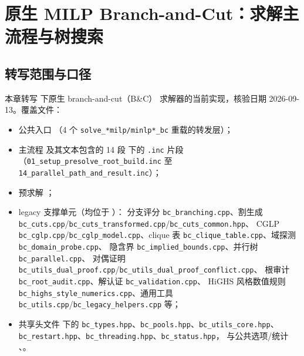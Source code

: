 
\section{原生 MILP Branch-and-Cut：求解主流程与树搜索}\label{sec:impl-milpbc}

\subsection{转写范围与口径}\label{subsec:milpbc-scope}

本章转写  下原生 branch-and-cut（B\&C）
求解器的当前实现，核验日期 2026-09-13。覆盖文件：

\begin{itemize}
  \item 公共入口 （4 个
        \texttt{solve\_*milp/minlp*\_bc} 重载的转发层）；
  \item 主流程 
        及其文本包含的 14 段 
        下的 \texttt{.inc} 片段（\texttt{01\_setup\_presolve\_root\_build.inc} 至
        \texttt{14\_parallel\_path\_and\_result.inc}）；
  \item 预求解 ；
  \item legacy 支撑单元（均位于
        ）：
        分支评分 \texttt{bc\_branching.cpp}、割生成
        \texttt{bc\_cuts.cpp}/\texttt{bc\_cuts\_transformed.cpp}/\texttt{bc\_cuts\_common.hpp}、
        CGLP \texttt{bc\_cglp.cpp}/\texttt{bc\_cglp\_model.cpp}、clique 表
        \texttt{bc\_clique\_table.cpp}、域探测 \texttt{bc\_domain\_probe.cpp}、
        隐含界 \texttt{bc\_implied\_bounds.cpp}、并行树 \texttt{bc\_parallel.cpp}、
        对偶证明 \texttt{bc\_utils\_dual\_proof.cpp}/\texttt{bc\_utils\_dual\_proof\_conflict.cpp}、
        根审计 \texttt{bc\_root\_audit.cpp}、解认证 \texttt{bc\_validation.cpp}、
        HiGHS 风格数值规则 \texttt{bc\_highs\_style\_numerics.cpp}、通用工具
        \texttt{bc\_utils.cpp}/\texttt{bc\_legacy\_helpers.cpp} 等；
  \item 共享头文件  下的
        \texttt{bc\_types.hpp}、\texttt{bc\_pools.hpp}、\texttt{bc\_utils\_core.hpp}、
        \texttt{bc\_restart.hpp}、\texttt{bc\_threading.hpp}、\texttt{bc\_status.hpp}，
        与公共选项/统计 、。
\end{itemize}

